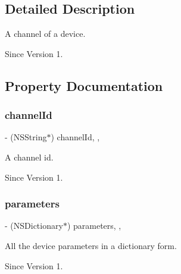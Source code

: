 \subsection{Detailed Description}
A channel of a device. 

\begin{DoxySince}{Since}
Version 1. 
\end{DoxySince}


\subsection{Property Documentation}
\hypertarget{class_x_i_device_channel_aa08449e44e03ac54b1acff4f37ff0de1}{}\label{class_x_i_device_channel_aa08449e44e03ac54b1acff4f37ff0de1} 
\subsubsection{\texorpdfstring{channel\+Id}{channelId}}
{\footnotesize\ttfamily -\/ (N\+S\+String$\ast$) channel\+Id\hspace{0.3cm}{\ttfamily [read]}, {\ttfamily [nonatomic]}, {\ttfamily [assign]}}



A channel id. 

\begin{DoxySince}{Since}
Version 1. 
\end{DoxySince}
\hypertarget{class_x_i_device_channel_a6220031fb31ab40ebbf0544132cf0846}{}\label{class_x_i_device_channel_a6220031fb31ab40ebbf0544132cf0846} 
\subsubsection{\texorpdfstring{parameters}{parameters}}
{\footnotesize\ttfamily -\/ (N\+S\+Dictionary$\ast$) parameters\hspace{0.3cm}{\ttfamily [read]}, {\ttfamily [nonatomic]}, {\ttfamily [assign]}}



All the device parameters in a dictionary form. 

\begin{DoxySince}{Since}
Version 1. 
\end{DoxySince}
\hypertarget{class_x_i_device_channel_a50b7bcaf00bdd4185d1a5cc39332c3f2}{}\label{class_x_i_device_channel_a50b7bcaf00bdd4185d1a5cc39332c3f2} 
